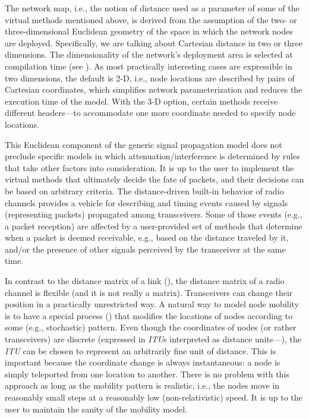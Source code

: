 The network map, i.e., the notion of distance used as a parameter of some of
the virtual methods mentioned above, is derived from the assumption of the
two- or three-dimensional Euclidean
geometry of the space in which the network nodes are deployed.
Specifically, we are talking about Cartesian distance in two or three
dimensions.
The dimensionality of the network's deployment area is selected at
compilation time (see ).
As most practically interesting cases are expressible in two dimensions,
the default is 2-D, i.e., node locations are described by pairs of
Cartesian coordinates,
which simplifies network parameterization and reduces the execution time
of the model.
With the 3-D option, certain methods receive different headers---to
accommodate one more coordinate needed to specify node locations.

This Euclidean component of the generic signal propagation model
does not preclude specific
models in which attenuation/interference is determined
by rules that take other factors into consideration.
It is up to the user to implement the virtual methods that ultimately decide 
the fate of packets, and their decisions can be based on arbitrary criteria.
The distance-driven built-in behavior of radio channels provides a
vehicle for describing and timing events caused by signals (representing
packets) propagated among transceivers.
Some of those events (e.g., a packet reception) are affected by a
user-provided set of methods that determine when a packet is deemed
receivable, e.g., based on the distance traveled by it, and/or the presence
of other signals perceived by the transceiver at the same time.

In contrast to the distance matrix of a link (), the distance
matrix of a radio channel is flexible (and it is not really a matrix).
Transceivers can change their position in a practically unrestricted way.
A natural way to model node mobility is to have a special process
() that modifies the locations of nodes according to some
(e.g., stochastic) pattern.
Even though the coordinates of nodes (or rather transceivers) are discrete
(expressed in {\em ITU\/}s interpreted as distance units---),
the {\em ITU\/} can be chosen to represent an arbitrarily fine unit of
distance.
This is important because the coordinate change is always instantaneous:
a node is simply teleported from one location to another.
There is no problem with this approach as long as the mobility pattern
is realistic, i.e., the nodes move in reasonably small steps at a
reasonably low (non-relativistic) speed.
It is up to the user to maintain the sanity of the mobility model.

